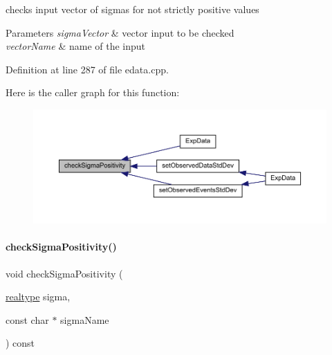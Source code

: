 checks input vector of sigmas for not strictly positive values


\begin{DoxyParams}{Parameters}
{\em sigma\+Vector} & vector input to be checked \\
\hline
{\em vector\+Name} & name of the input \\
\hline
\end{DoxyParams}


Definition at line 287 of file edata.\+cpp.

Here is the caller graph for this function\+:
\nopagebreak
\begin{figure}[H]
\begin{center}
\leavevmode
\includegraphics[width=350pt]{classamici_1_1_exp_data_a30d756faaf9ea395446fbc5c65a7b125_icgraph}
\end{center}
\end{figure}
\mbox{\label{classamici_1_1_exp_data_a0ed66c4deb1937ad309e8c52a452d9eb}} 
\paragraph{\texorpdfstring{check\+Sigma\+Positivity()}{checkSigmaPositivity()}\hspace{0.1cm}{\footnotesize\ttfamily [2/2]}}
{\footnotesize\ttfamily void check\+Sigma\+Positivity (\begin{DoxyParamCaption}\item[{\mbox{\hyperlink{namespaceamici_a1bdce28051d6a53868f7ccbf5f2c14a3}{realtype}}}]{sigma,  }\item[{const char $\ast$}]{sigma\+Name }\end{DoxyParamCaption}) const\hspace{0.3cm}{\ttfamily [protected]}}

